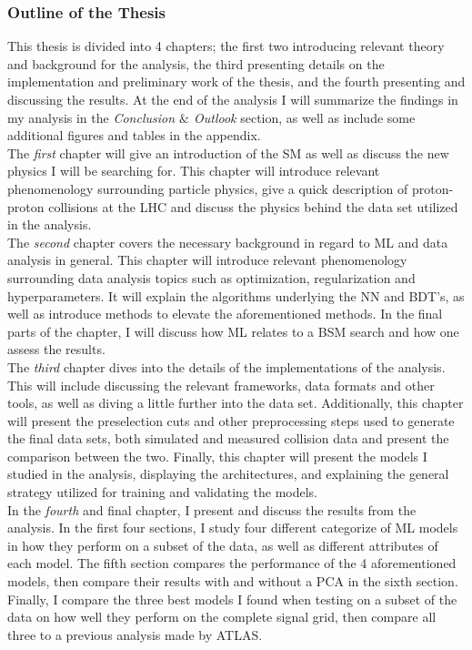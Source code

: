 \subsubsection*{Outline of the Thesis}
This thesis is divided into 4 chapters; the first two introducing relevant theory and background for the analysis, the third presenting 
details on the implementation and preliminary work of the thesis, and the fourth presenting and discussing the results. At the end of the analysis I will summarize 
the findings in my analysis in the \emph{Conclusion $\&$ Outlook} section, as well as include some additional figures and tables 
in the appendix. 
\\
The \emph{first} chapter will give an introduction of the \ac{SM} as well as discuss the new physics I will be searching for. This chapter will 
introduce relevant phenomenology surrounding particle physics, give a quick description of proton-proton collisions at the \ac{LHC} and discuss 
the physics behind the data set utilized in the analysis. 
\\
The \emph{second} chapter covers the necessary background in regard to \ac{ML} and data analysis in general. This chapter will introduce relevant phenomenology
surrounding data analysis topics such as optimization, regularization and hyperparameters. It will explain the algorithms underlying the \ac{NN} and 
\ac{BDT}'s, as well as introduce methods to elevate the aforementioned methods. In the final parts of the chapter, I will discuss how \ac{ML} relates to 
a \ac{BSM} search and how one assess the results.
\\
The \emph{third} chapter dives into the details of the implementations of the analysis. This will include discussing the relevant frameworks, data formats and 
other tools, as well as diving a little further into the data set. Additionally, this chapter will present the preselection cuts and other preprocessing steps
used to generate the final data sets, both simulated and measured collision data and present the comparison between the two. Finally, this chapter will present the 
models I studied in the analysis, displaying the architectures, and explaining the general strategy utilized for training and validating the models.
\\
In the \emph{fourth} and final chapter, I present and discuss the results from the analysis. In the first four sections, I study four different categorize of \ac{ML} models in how they 
perform on a subset of the data, as well as different attributes of each model. The fifth section compares the performance of the 4 aforementioned models, then compare 
their results with and without a \acs{PCA} in the sixth section. Finally, I compare the three best models I found when testing on a subset of the data on how well they perform 
on the complete signal grid, then compare all three to a previous analysis made by \acs{ATLAS}.



